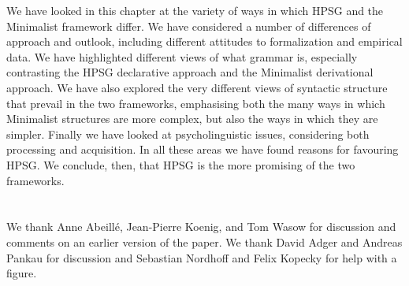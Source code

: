 \documentclass[output=paper,biblatex,babelshorthands,newtxmath,draftmode,colorlinks,citecolor=brown]{langscibook}
\begin{document}
We have looked in this chapter at the variety of ways in which HPSG and the Minimalist framework
differ. We have considered a number of differences of approach and outlook, including different
attitudes to formalization and empirical data. We have highlighted different views of what grammar
is, especially contrasting the HPSG declarative approach and the Minimalist derivational
approach. We have also explored the very different views of syntactic structure that prevail in the
two frameworks, emphasising both the many ways in which Minimalist structures are more complex, but
also the ways in which they are simpler. Finally we have looked at psycholinguistic issues, considering
both processing and acquisition. In all these areas we have found reasons for favouring HPSG. We
conclude, then, that HPSG is the more promising of the two frameworks.



\section*{\acknowledgmentsUS}

We thank Anne Abeillé, Jean-Pierre Koenig, and Tom Wasow for discussion and comments on an earlier
version of the paper. We thank David Adger and Andreas Pankau for discussion and Sebastian Nordhoff
and Felix Kopecky for help with a figure.



\end{document}
